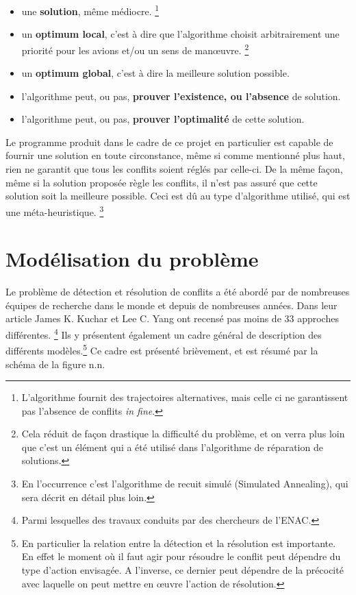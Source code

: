 \begin{itemize}
\item une \textbf{solution}, même médiocre. \footnote{L'algorithme fournit des trajectoires alternatives, mais celle ci ne garantissent pas l'absence de conflits \textit{in fine}.} \\
\item un \textbf{optimum local}, c'est à dire que l'algorithme choisit arbitrairement une priorité pour les avions et/ou un sens de manœuvre. \footnote{Cela réduit de façon drastique la difficulté du problème, et on verra plus loin que c'est un élément qui a été utilisé dans l'algorithme de réparation de solutions.} \\
\item un \textbf{optimum global}, c'est à dire la meilleure solution possible.\\
\item l'algorithme peut, ou pas,\textbf{ prouver l'existence, ou l'absence} de solution.\\
\item l'algorithme peut, ou pas, \textbf{prouver l'optimalité} de cette solution. \\
\end{itemize}

Le programme produit dans le cadre de ce projet en particulier est capable de fournir une solution en toute circonstance, même si comme mentionné plus haut, rien ne garantit que tous les conflits soient réglés par celle-ci. De la même façon, même si la solution proposée règle les conflits, il n'est pas assuré que cette solution soit la meilleure possible. Ceci est dû au type d'algorithme utilisé, qui est une méta-heuristique. \footnote{En l'occurrence c'est l'algorithme de recuit simulé (Simulated Annealing), qui sera décrit en détail plus loin. }


\section{Modélisation du problème}

Le problème de détection et résolution de conflits a été abordé par de nombreuses équipes de recherche dans le monde et depuis de nombreuses années. Dans leur article \cite{Kuchar} James K. Kuchar et Lee C. Yang ont recensé pas moins de 33 approches différentes. \footnote{Parmi lesquelles des travaux conduits par des chercheurs de l'ENAC.} Ils y présentent également un cadre général de description des différents modèles.\footnote{ En particulier la relation entre la détection et la résolution est importante. En effet le moment où il faut agir pour résoudre le conflit peut dépendre du type d'action envisagée. A l'inverse, ce dernier peut dépendre de la précocité avec laquelle on peut mettre en œuvre l'action de résolution.} Ce cadre est présenté brièvement, et est résumé par la schéma de la figure n.n.

